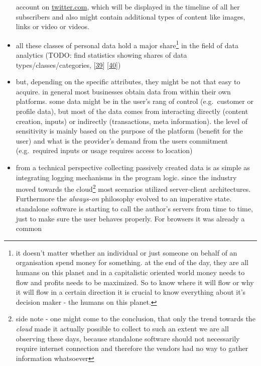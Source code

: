 \documentclass[12pt,english,a4paper,titlepage,cleardoublepage=empty,dottedtoc]{report}
\begin{document}
\begin{itemize}
{    account on \url{twitter.com}, which will be displayed in the
    timeline of all her subscribers and also might contain additional
    types of content like images, links or video} or videos.
\item
  all these classes of personal data hold a major share\footnote{it
    doesn't matter whether an individual or just someone on behalf of an
    organisation spend money for something. at the end of the day, they
    are all humans on this planet and in a capitalistic oriented world
    money needs to flow and profits needs to be maximized. So to know
    where it will flow or why it will flow in a certain direction it is
    crucial to know everything about it's decision maker - the humans on
    this planet.} in the field of data analytics (TODO: find statistics
  showing shares of data types/classes/categories,
  {[}\protect\hyperlink{ref-book-chapter_1999_Principles-of-knowledge-discovery-in-databases_introduction-to-data-mining}{39}{]}
  {[}\protect\hyperlink{ref-web_2013_big-data-collection-collides-with-privacy-concerns}{40}{]})
\item
  but, depending on the specific attributes, they might be not that easy
  to acquire. in general most businesses obtain data from within their
  own platforms. some data might be in the user's rang of control
  (e.g.~customer or profile data), but most of the data comes from
  interacting directly (content creation, inputs) or indirectly
  (transactions, meta information). the level of sensitivity is mainly
  based on the purpose of the platform (benefit for the user) and what
  is the provider's demand from the users commitment (e.g.~required
  inputs or usage requires access to location)
\item
  from a technical perspective collecting passively created data is as
  simple as integrating logging mechanisms in the program logic. since
  the industry moved towards the cloud\footnote{side note - one might
    come to the conclusion, that only the trend towards the \emph{cloud}
    made it actually possible to collect to such an extent we are all
    observing these days, because standalone software should not
    necessarily require internet connection and therefore the vendors
    had no way to gather information whatsoever} most scenarios utilized
  server-client architectures. Furthermore the \emph{always-on}
  philosophy evolved to an imperative state. standalone software is
  starting to call the author's servers from time to time, just to make
  sure the user behaves properly. For browsers it was already a common

\end{itemize}
\end{document}
